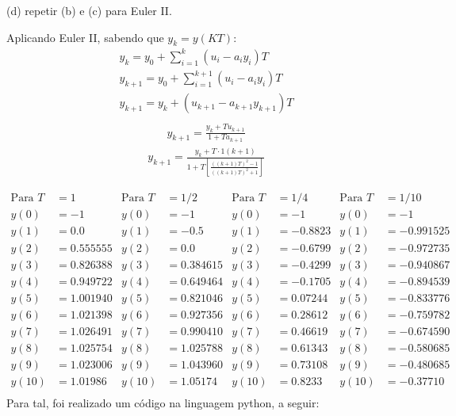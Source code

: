 \documentclass[10pt]{article}
\begin{document}
(d) repetir (b) e (c) para Euler II.

Aplicando Euler II, sabendo que $ y_k = y(KT) $:
\begin{align*}
    y_k = y_0 + \sum_{i=1}^{k} (u_i - a_i y_i)T\\
    y_{k+1} = y_0 + \sum_{i=1}^{k+1} (u_i - a_i y_i)T\\
    y_{k+1} = y_k + (u_{k+1} - a_{k+1} y_{k+1})T\\
\end{align*}
\begin{align*}
    y_{k+1} = \frac{y_k + Tu_{k+1}}{1 + Ta_{k+1}}
\end{align*}
\begin{align*}
    y_{k+1} = \frac{y_k + T \cdot 1(k+1)}{1 + T \left[\frac{((k+1)T)^2-1}{((k+1)T)^2+1} \right]}
\end{align*}

\begin{align*}
    \text{Para } T &= 1  & \text{Para } T &= 1/2  &  \text{Para } T &= 1/4   & \text{Para } T &= 1/10\\
    y(0) &= -1           & y(0) &= -1             &  y(0) &= -1              &  y(0) &= -1\\
    y(1) &= 0.0          & y(1) &= -0.5           &  y(1) &= -0.8823         &  y(1) &= -0.991525\\
    y(2) &= 0.555555     & y(2) &= 0.0            &  y(2) &= -0.6799         &  y(2) &= -0.972735\\
    y(3) &= 0.826388     & y(3) &= 0.384615       &  y(3) &= -0.4299         &  y(3) &= -0.940867\\
    y(4) &= 0.949722     & y(4) &= 0.649464       &  y(4) &= -0.1705         &  y(4) &= -0.894539\\
    y(5) &= 1.001940     & y(5) &= 0.821046       &  y(5) &= 0.07244         &  y(5) &= -0.833776\\
    y(6) &= 1.021398     & y(6) &= 0.927356       &  y(6) &= 0.28612         &  y(6) &= -0.759782\\
    y(7) &= 1.026491     & y(7) &= 0.990410       &  y(7) &= 0.46619         &  y(7) &= -0.674590\\
    y(8) &= 1.025754     & y(8) &= 1.025788       &  y(8) &= 0.61343         &  y(8) &= -0.580685\\
    y(9) &= 1.023006     & y(9) &= 1.043960       &  y(9) &= 0.73108         &  y(9) &= -0.480685\\
    y(10) &= 1.01986     & y(10) &= 1.05174       &  y(10) &= 0.8233         &  y(10) &= -0.37710\\
\end{align*}
Para tal, foi realizado um código na linguagem python, a seguir:
\end{document}
